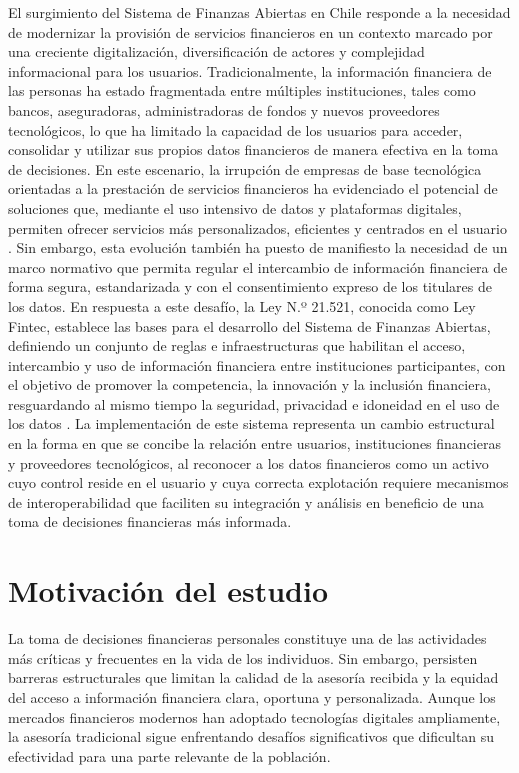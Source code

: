 \documentclass[
	spanish, %
	letterpaper, oneside
]{book}
\begin{document}
El surgimiento del Sistema de Finanzas Abiertas en Chile responde a la necesidad de modernizar la provisión de servicios financieros en un contexto marcado por una creciente digitalización, diversificación de actores y complejidad informacional para los usuarios. Tradicionalmente, la información financiera de las personas ha estado fragmentada entre múltiples instituciones, tales como bancos, aseguradoras, administradoras de fondos y nuevos proveedores tecnológicos, lo que ha limitado la capacidad de los usuarios para acceder, consolidar y utilizar sus propios datos financieros de manera efectiva en la toma de decisiones. En este escenario, la irrupción de empresas de base tecnológica orientadas a la prestación de servicios financieros ha evidenciado el potencial de soluciones que, mediante el uso intensivo de datos y plataformas digitales, permiten ofrecer servicios más personalizados, eficientes y centrados en el usuario \cite{cmf_fintech}. Sin embargo, esta evolución también ha puesto de manifiesto la necesidad de un marco normativo que permita regular el intercambio de información financiera de forma segura, estandarizada y con el consentimiento expreso de los titulares de los datos. En respuesta a este desafío, la Ley N.º 21.521, conocida como Ley Fintec, establece las bases para el desarrollo del Sistema de Finanzas Abiertas, definiendo un conjunto de reglas e infraestructuras que habilitan el acceso, intercambio y uso de información financiera entre instituciones participantes, con el objetivo de promover la competencia, la innovación y la inclusión financiera, resguardando al mismo tiempo la seguridad, privacidad e idoneidad en el uso de los datos \cite{ley21521}. La implementación de este sistema representa un cambio estructural en la forma en que se concibe la relación entre usuarios, instituciones financieras y proveedores tecnológicos, al reconocer a los datos financieros como un activo cuyo control reside en el usuario y cuya correcta explotación requiere mecanismos de interoperabilidad que faciliten su integración y análisis en beneficio de una toma de decisiones financieras más informada.

\section{Motivación del estudio}

La toma de decisiones financieras personales constituye una de las actividades más críticas y frecuentes en la vida de los individuos. Sin embargo, persisten barreras estructurales que limitan la calidad de la asesoría recibida y la equidad del acceso a información financiera clara, oportuna y personalizada. Aunque los mercados financieros modernos han adoptado tecnologías digitales ampliamente, la asesoría tradicional sigue enfrentando desafíos significativos que dificultan su efectividad para una parte relevante de la población.
\end{document}
